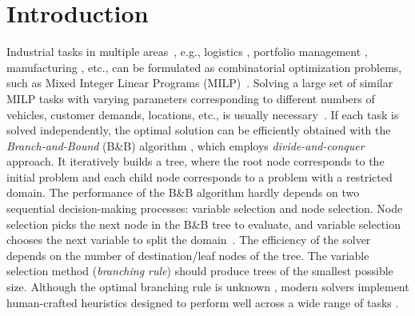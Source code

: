 \documentclass[preprint,12pt]{elsarticle} %
\theoremstyle{plain}
\theoremstyle{definition}
\theoremstyle{remark}
\begin{document}


\section{Introduction}
Industrial tasks in multiple areas~\cite{chiou2024knowledge,shen2025reinforcement}, e.g., logistics \cite{vrp}, portfolio management \cite{Markowitz1952}, manufacturing \cite{chip_design},  %
etc., can be formulated as combinatorial optimization problems, such as Mixed Integer Linear Programs (MILP)~\cite{wolsey1999integer}. Solving a large set of similar MILP tasks with varying parameters corresponding to different numbers of vehicles, customer demands, locations, etc., is usually necessary~\cite{hu2020reinforcement}. If each task is solved independently, the optimal solution can be efficiently obtained with the \emph{Branch-and-Bound} (B\&B) algorithm \cite{BnB}, which employs \emph{divide-and-conquer} approach. It iteratively builds a tree, where the root node corresponds to the initial problem and each child node corresponds to a problem with a restricted domain. The performance of the B\&B algorithm hardly depends on two sequential decision-making processes: variable selection and node selection. Node selection picks the next node in the B\&B tree to evaluate, and variable selection chooses the next variable to split the domain~\cite{Linderoth1999}. The efficiency of the solver depends on the number of destination/leaf nodes of the tree. The variable selection method (\emph{branching rule}) should produce trees of the smallest possible size. Although the optimal branching rule is unknown \cite{lodi2017learning}, modern solvers implement human-crafted heuristics designed to perform well across a wide range of tasks \cite{gleixner2021miplib}. 
\end{document}
